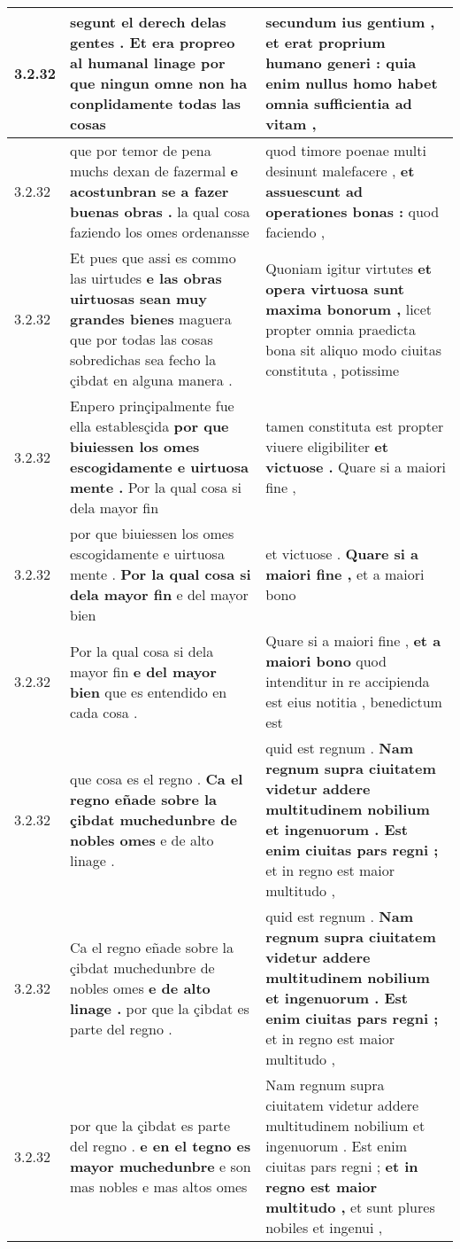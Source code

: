 \begin{tabular}{|p{1cm}|p{6.5cm}|p{6.5cm}|}
3.2.32 & segunt el derech delas gentes . \textbf{ Et era propreo al humanal linage } por que ningun omne non ha conplidamente todas las cosas & secundum ius gentium , \textbf{ et erat proprium humano generi : } quia enim nullus homo habet omnia sufficientia ad vitam , \\\hline
3.2.32 & que por temor de pena muchs dexan de fazermal \textbf{ e acostunbran se a fazer buenas obras . } la qual cosa faziendo los omes ordenansse & quod timore poenae multi desinunt malefacere , \textbf{ et assuescunt ad operationes bonas : } quod faciendo , \\\hline
3.2.32 & Et pues que assi es commo las uirtudes \textbf{ e las obras uirtuosas sean muy grandes bienes } maguera que por todas las cosas sobredichas sea fecho la çibdat en alguna manera . & Quoniam igitur virtutes \textbf{ et opera virtuosa sunt maxima bonorum , } licet propter omnia praedicta bona sit aliquo modo ciuitas constituta , potissime \\\hline
3.2.32 & Enpero prinçipalmente fue ella establesçida \textbf{ por que biuiessen los omes escogidamente e uirtuosa mente . } Por la qual cosa si dela mayor fin & tamen constituta est propter viuere eligibiliter \textbf{ et victuose . } Quare si a maiori fine , \\\hline
3.2.32 & por que biuiessen los omes escogidamente e uirtuosa mente . \textbf{ Por la qual cosa si dela mayor fin } e del mayor bien & et victuose . \textbf{ Quare si a maiori fine , } et a maiori bono \\\hline
3.2.32 & Por la qual cosa si dela mayor fin \textbf{ e del mayor bien } que es entendido en cada cosa . & Quare si a maiori fine , \textbf{ et a maiori bono } quod intenditur in re accipienda est eius notitia , benedictum est \\\hline
3.2.32 & que cosa es el regno . \textbf{ Ca el regno eñade sobre la çibdat muchedunbre de nobles omes } e de alto linage . & quid est regnum . \textbf{ Nam regnum supra ciuitatem videtur addere multitudinem nobilium et ingenuorum . Est enim ciuitas pars regni ; } et in regno est maior multitudo , \\\hline
3.2.32 & Ca el regno eñade sobre la çibdat muchedunbre de nobles omes \textbf{ e de alto linage . } por que la çibdat es parte del regno . & quid est regnum . \textbf{ Nam regnum supra ciuitatem videtur addere multitudinem nobilium et ingenuorum . Est enim ciuitas pars regni ; } et in regno est maior multitudo , \\\hline
3.2.32 & por que la çibdat es parte del regno . \textbf{ e en el tegno es mayor muchedunbre } e son mas nobles e mas altos omes & Nam regnum supra ciuitatem videtur addere multitudinem nobilium et ingenuorum . Est enim ciuitas pars regni ; \textbf{ et in regno est maior multitudo , } et sunt plures nobiles et ingenui , \\\hline

\end{tabular}
